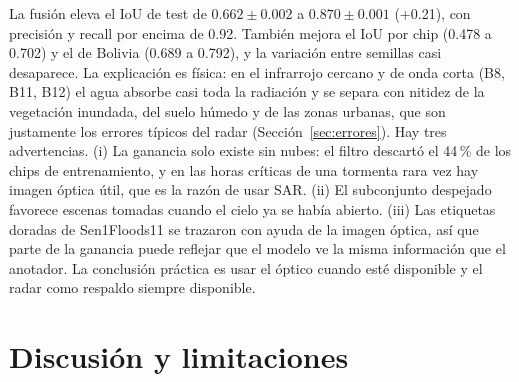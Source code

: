 \documentclass{article}
\newcommand{\RES}[1]{\textcolor{red}{#1}}
\begin{document}
\begin{table}[H]
  \caption{Bono: chips sin nubes. Media $\pm$ desviación estándar sobre 3 semillas.}
  \label{tab:bono}
  \centering
  \scriptsize
  \IfFileExists{bono.tex}{\resizebox{\linewidth}{!}{}}{\RES{[falta bono.tex]}}
\end{table}

La fusión eleva el IoU de test de $0.662\pm0.002$ a $0.870\pm0.001$ (+0.21), con precisión y recall por
encima de 0.92. También mejora el IoU por chip (0.478 a 0.702) y el de Bolivia (0.689 a 0.792), y la
variación entre semillas casi desaparece. La explicación es física: en el infrarrojo cercano y de onda
corta (B8, B11, B12) el agua absorbe casi toda la radiación y se separa con nitidez de la vegetación
inundada, del suelo húmedo y de las zonas urbanas, que son justamente los errores típicos del radar
(Sección~\ref{sec:errores}). Hay tres advertencias. (i) La ganancia solo existe sin nubes: el filtro
descartó el 44\,\% de los chips de entrenamiento, y en las horas críticas de una tormenta rara vez hay
imagen óptica útil, que es la razón de usar SAR. (ii) El subconjunto despejado favorece escenas tomadas
cuando el cielo ya se había abierto. (iii) Las etiquetas doradas de Sen1Floods11 se trazaron con ayuda de
la imagen óptica, así que parte de la ganancia puede reflejar que el modelo ve la misma información que el
anotador. La conclusión práctica es usar el óptico cuando esté disponible y el radar como respaldo siempre
disponible.

\section{Discusión y limitaciones}
\end{document}
